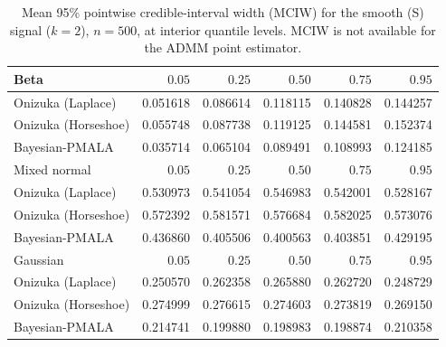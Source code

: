 \begin{table}[!htbp]
\centering
\small
\caption{Mean 95\% pointwise credible-interval width (MCIW) for the smooth (S) signal ($k=2$), $n=500$, at interior quantile levels. MCIW is not available for the ADMM point estimator.}
\label{tab:s_int_mciw}
\begin{tabular}{lrrrrr}
\toprule
Beta & $0.05$ & $0.25$ & $0.50$ & $0.75$ & $0.95$ \\
\midrule
Onizuka (Laplace) & 0.051618 & 0.086614 & 0.118115 & 0.140828 & 0.144257 \\
Onizuka (Horseshoe) & 0.055748 & 0.087738 & 0.119125 & 0.144581 & 0.152374 \\
Bayesian-PMALA & 0.035714 & 0.065104 & 0.089491 & 0.108993 & 0.124185 \\
\midrule
Mixed normal & $0.05$ & $0.25$ & $0.50$ & $0.75$ & $0.95$ \\
\midrule
Onizuka (Laplace) & 0.530973 & 0.541054 & 0.546983 & 0.542001 & 0.528167 \\
Onizuka (Horseshoe) & 0.572392 & 0.581571 & 0.576684 & 0.582025 & 0.573076 \\
Bayesian-PMALA & 0.436860 & 0.405506 & 0.400563 & 0.403851 & 0.429195 \\
\midrule
Gaussian & $0.05$ & $0.25$ & $0.50$ & $0.75$ & $0.95$ \\
\midrule
Onizuka (Laplace) & 0.250570 & 0.262358 & 0.265880 & 0.262720 & 0.248729 \\
Onizuka (Horseshoe) & 0.274999 & 0.276615 & 0.274603 & 0.273819 & 0.269150 \\
Bayesian-PMALA & 0.214741 & 0.199880 & 0.198983 & 0.198874 & 0.210358 \\
\bottomrule
\end{tabular}
\end{table}
